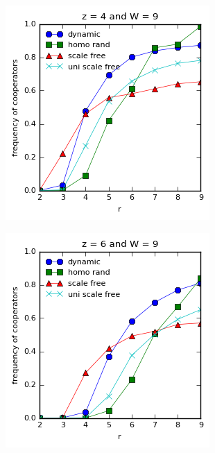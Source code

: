 \documentclass{article}
\begin{document}
	\begin{figure}[h]
		\centering
		\begin{subfigure}[b]{0.4\textwidth}
			\includegraphics[width=\textwidth]{fig/dynamic/z4dynfix.png}
			\caption{}
		\end{subfigure}
		\begin{subfigure}[b]{0.4\textwidth}
			\includegraphics[width=\textwidth]{fig/dynamic/z6dynfix.png}

\end{subfigure}
\end{figure}
\end{document}
